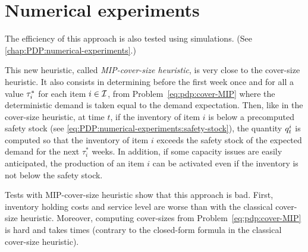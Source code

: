 \section{Numerical experiments}
\label{sec:pdp-cover:numerical-experiments}


The efficiency of this approach is also tested using simulations. (See \cref{chap:PDP:numerical-experiments}.)


This new heuristic, called \emph{MIP-cover-size heuristic}, is very close to the cover-size heuristic.
It also consists in determining before the first week once and for all a value $\tau_i^*$ for each item $i\in\mathcal{I}$, from Problem~\eqref{eq:pdp:cover-MIP} where the deterministic demand is taken equal to the demand expectation.
Then, like in the cover-size heuristic, at time $t$, if the inventory of item $i$ is below a precomputed safety stock (see \cref{eq:PDP:numerical-experiments:safety-stock}), the quantity $q_t^i$ is computed so that the inventory of item $i$ exceeds the safety stock of the expected demand for the next $\tau_i^*$ weeks.
In addition, if some capacity issues are easily anticipated, the production of an item $i$ can be activated even if the inventory is not below the safety stock.


Tests with MIP-cover-size heuristic show that this approach is bad.
First, inventory holding costs and service level are worse than with the classical cover-size heuristic.
Moreover, computing cover-sizes from Problem~\eqref{eq:pdp:cover-MIP} is hard and takes times (contrary to the closed-form formula in the classical cover-size heuristic).



